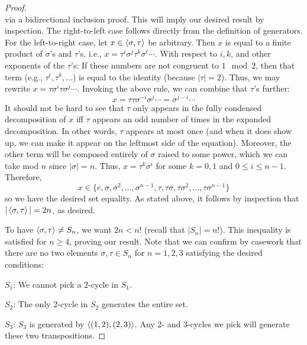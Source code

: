 \documentclass[../psets.tex]{subfiles}
\begin{document}
\begin{enumerate}
\begin{proof}
\begin{equation*}
        \end{equation*}
        via a bidirectional inclusion proof. This will imply our desired result by inspection. The right-to-left case follows directly from the definition of generators. For the left-to-right case, let $x\in\left\langle{\sigma,\tau}\right\rangle$ be arbitrary. Then $x$ is equal to a finite product of $\sigma$'s and $\tau$'s, i.e., $x=\tau^i\sigma^j\tau^k\sigma^\ell\cdots$. With respect to $i,k$, and other exponents of the $\tau$'s: If these numbers are not congruent to $1\mod 2$, then that term (e.g., $\tau^i,\tau^k,\dots$) is equal to the identity (because $|\tau|=2$). Thus, we may rewrite $x=\tau\sigma^i\tau\sigma^j\cdots$. Invoking the above rule, we can combine that $\tau$'s further:
        \begin{equation*}
            x = \tau\tau\sigma^{-i}\sigma^j\cdots
            = \sigma^{j-i}\cdots
        \end{equation*}
        It should not be hard to see that $\tau$ only appears in the fully condensed decomposition of $x$ iff $\tau$ appears an odd number of times in the expanded decomposition. In other words, $\tau$ appears at most once (and when it does show up, we can make it appear on the leftmost side of the equation). Moreover, the other term will be composed entirely of $\sigma$ raised to some power, which we can take mod $n$ since $|\sigma|=n$. Thus, $x=\tau^k\sigma^i$ for some $k=0,1$ and $0\leq i\leq n-1$. Therefore,
        \begin{equation*}
            x \in \{e,\sigma,\sigma^2,\dots,\sigma^{n-1},\tau,\tau\sigma,\tau\sigma^2,\dots,\tau\sigma^{n-1}\}
        \end{equation*}
        so we have the desired set equality. As stated above, it follows by inspection that $|\left\langle{\sigma,\tau}\right\rangle|=2n$, as desired.\par
        To have $\left\langle{\sigma,\tau}\right\rangle\neq S_n$, we want $2n<n!$ (recall that $|S_n|=n!$). This inequality is satisfied for $n\geq 4$, proving our result. Note that we can confirm by casework that there are no two elements $\sigma,\tau\in S_n$ for $n=1,2,3$ satisfying the desired conditions:\par
        $S_1$: We cannot pick a 2-cycle in $S_1$.\par
        $S_2$: The only 2-cycle in $S_2$ generates the entire set.\par
        $S_3$: $S_3$ is generated by $\left\langle{(1,2),(2,3)}\right\rangle$. Any 2- and 3-cycles we pick will generate these two transpositions.
    \end{proof}

\end{enumerate}
\end{document}
